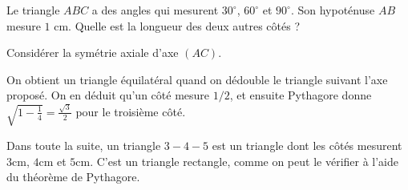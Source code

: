 \begin{exo}
Le triangle $ABC$ a des angles qui mesurent $30^\circ$, $60^\circ$ et $90^\circ$.
Son hypoténuse $AB$ mesure $1$ cm.
Quelle est la longueur des deux autres côtés ?
\begin{center}
\end{center}
\begin{hint}
Considérer la symétrie axiale d'axe $(AC)$.
\end{hint}
\begin{sol}
On obtient un triangle équilatéral quand on dédouble le triangle suivant l'axe proposé. On en déduit qu'un côté mesure $1/2$, et ensuite Pythagore donne $\sqrt{1-\frac14} = \frac{\sqrt 3}{2}$ pour le troisième côté.
\end{sol}
\end{exo}



Dans toute la suite, un triangle \og $3-4-5$\fg{} est un triangle dont les côtés mesurent $3$cm, $4$cm et $5$cm. C'est un triangle rectangle, comme on peut le vérifier à l'aide du théorème de Pythagore.





